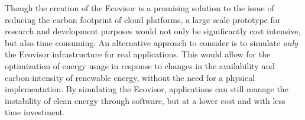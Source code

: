 Though the creation of the Ecovisor is a promising solution to the issue of
reducing the carbon footprint of cloud platforms, a large scale prototype for
research and development purposes would not only be significantly cost
intensive, but also time consuming. An alternative approach to consider is to
simulate \emph{only} the Ecovisor infrastructure for real applications. This
would allow for the optimization of energy usage in response to changes in the
availability and carbon-intensity of renewable energy, without the need for a
physical implementation. By simulating the Ecovisor, applications can still
manage the instability of clean energy through software, but at a lower cost and
with less time investment.
\medskip

